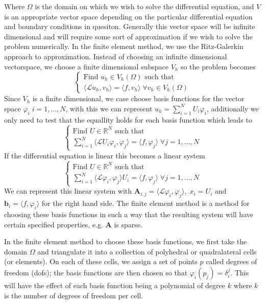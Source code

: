 \documentclass[12pt]{article}
\begin{document}
Where $\Omega$ is the domain on which we wish to solve the differential equation, and $V$ is an appropriate vector space depending on the particular differential equation and boundary conditions in quesiton. Generally this vector space will be infinite dimensional and will require some sort of approximation if we wish to solve the problem numerically. In the finite element method, we use the Ritz-Galerkin approach to approximation. Instead of choosing an infinite dimensional vectorspace, we choose a finite dimensional subspace $V_{h}$ so the problem becomes
\[
\begin{cases} 
	\text{Find } u_{h} \in V_{h}(\Omega) \text{ such that } \\
	\langle \mathcal{L}u_{h}, v_{h} \rangle = \langle f, v_{h} \rangle \; \forall v_{h} \in V_{h}(\Omega)
\end{cases}
\]
Since $V_{h}$ is a finite dimensional, we case choose basis functions for the vector space $\varphi_{i} \; i = 1, ..., N$, with this we can represent $u_{h} = \sum_{i = 1}^{N} U_{i}\varphi_{i}$, additionally we only need to test that the equallity holds for each basis function which leads to
\[
\begin{cases} 
	\text{Find } U \in \mathbb{R}^{N} \text{ such that } \\
	\sum_{i = 1}^{N}\langle \mathcal{L}U_{i}\varphi_{i}, \varphi_{j} \rangle = \langle f, \varphi_{j} \rangle \; \forall j = 1, \ldots, N
\end{cases}
\]
If the differential equation is linear this becomes a linear system
\[
\begin{cases} 
	\text{Find } U \in \mathbb{R}^{N} \text{ such that } \\
	\sum_{i = 1}^{N}\langle \mathcal{L}\varphi_{i}, \varphi_{j} \rangle U_{i} = \langle f, \varphi_{j} \rangle \; \forall j = 1, \ldots, N
\end{cases}
\]
We can represent this linear system with $\mathbf{A}_{i,j} = \langle \mathcal{L}\varphi_{i}, \varphi_{j} \rangle,\; x_{i} = U_{i}$ and $\mathbf{b}_{i} = \langle f, \varphi_{i} \rangle$ for the right hand side. The finite element method is a method for choosing these basis functions in such a way that the resulting system will have certain specified properties, e.g. $\mathbf{A}$ is sparse.

In the finite element method to choose these basis functions, we first take the domain $\Omega$ and triangulate it into a collection of polyhedral or quadralateral cells (or elements). On each of these cells, we assign a set of points $p$ called degrees of freedom (dofs); the basis functions are then chosen so that $\varphi_{i}(p_{j}) = \delta_{i}^{j}$. This will have the effect of each basis function being a polynomial of degree $k$ where $k$ is the number of degrees of freedom per cell.
\end{document}
